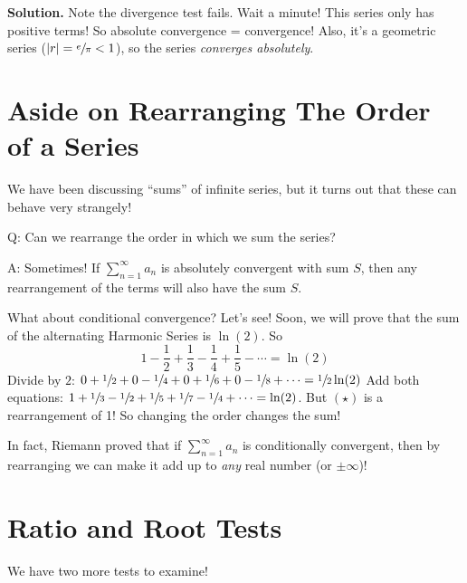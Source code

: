 \begin{Example}{}{}
\begin{enumerate}
              \textbf{Solution.} Note the divergence test fails. Wait a minute! This series only has positive
              terms! So absolute convergence = convergence! Also, it's a geometric series
              ($ \lvert r\rvert=\sfrac{e}{\pi} <1 $), so the series \emph{converges absolutely}.
    \end{enumerate}
\end{Example}

\section*{Aside on Rearranging The Order of a Series}
We have been discussing ``sums'' of infinite series, but it turns out
that these can behave very strangely!

Q\@: Can we rearrange the order in which we sum the series?

A\@: Sometimes! If $ \sum\limits_{n=1}^{\infty} a_n $ is absolutely convergent
with sum $ S $, then any rearrangement of the terms will also have the sum $ S $.

What about conditional convergence? Let's see! Soon, we will prove that the sum
of the alternating Harmonic Series is $ \ln(2) $. So
\[ 1-\frac{1}{2} +\frac{1}{3} -\frac{1}{4} +\frac{1}{5} -\cdots=\ln(2) \]
Divide by $ 2 $: $ 0+\sfrac{1}{2}+0-\sfrac{1}{4} +0+\sfrac{1}{6} +0-\sfrac{1}{8} +\cdots=
    \sfrac{1}{2} \ln(2) $
Add both equations: $ 1+\sfrac{1}{3} -\sfrac{1}{2} +\sfrac{1}{5} +\sfrac{1}{7} -\sfrac{1}{4} +\cdots
    =\ln(2) $. But $ (\star) $ is a rearrangement of 1! So changing the order changes the sum!

In fact, Riemann proved that if $ \sum\limits_{n=1}^{\infty} a_n $ is conditionally
convergent, then by rearranging we can make it add up to \emph{any} real number
(or $ \pm\infty $)!

\section{Ratio and Root Tests}
We have two more tests to examine!

